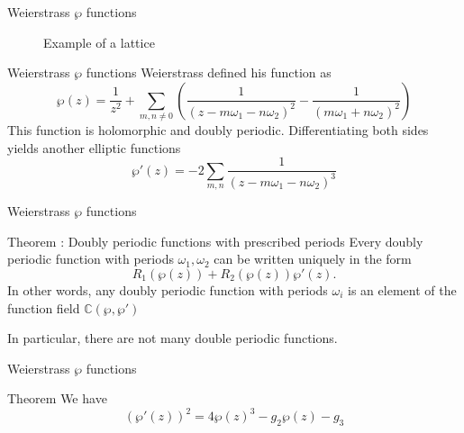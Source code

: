 \documentclass[pdf]{beamer}
\begin{document}
\begin{frame}{Weierstrass $\wp$ functions}
  \begin{figure}[h]
  \centering
  \caption{Example of a lattice}
  \label{fig:example}
\end{figure}  
\end{frame}
\begin{frame}{Weierstrass $\wp$ functions}
    Weierstrass defined his function as 
    \[\wp(z) = \dfrac{1}{z^2}+ \sum_{m,n \ne 0}\left(\dfrac{1}{(z-m\omega_1-n\omega_2)^2} -\dfrac{1}{(m\omega_1+n\omega_2)^2}\right)\]
    This function is holomorphic and doubly periodic. 
    \pause
    Differentiating both sides yields another elliptic functions
    \[\wp'(z) = -2 \sum_{m,n}\dfrac{1}{(z-m\omega_1-n\omega_2)^3}\]
\end{frame}
\begin{frame}{Weierstrass $\wp$ functions}
    \begin{block}{Theorem : Doubly periodic functions with prescribed periods}
    Every doubly periodic function with periods $\omega_1,\omega_2$ can be written uniquely in the form
    \[R_1(\wp(z))+ R_2(\wp(z))\wp'(z).\]
    In other words, any doubly periodic function with periods $\omega_i$ is an element of the function field $\mathbb{C}(\wp,\wp')$
    \end{block}
In particular, there are not many double periodic functions. 
\end{frame}
\begin{frame}{Weierstrass $\wp$ functions}
    \begin{block}{Theorem }
    We have
    \[(\wp'(z))^2 = 4\wp(z)^3-g_2\wp(z)-g_3\]
    \end{block}
\end{frame}
\end{document}
